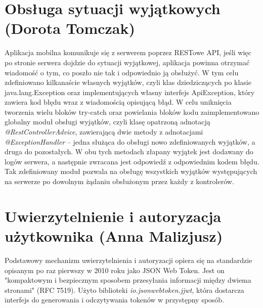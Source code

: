 \documentclass[10pt,twoside,a4paper]{report}
\begin{document}
\section{Obsługa sytuacji wyjątkowych (Dorota Tomczak)}
\par Aplikacja mobilna komunikuje się z serwerem poprzez RESTowe API, jeśli więc po stronie serwera dojdzie do sytuacji wyjątkowej, aplikacja powinna otrzymać wiadomość o tym, co poszło nie tak i odpowiednio ją obsłużyć. W tym celu zdefiniowano kilkanaście własnych wyjątków, czyli klas dziedziczących po klasie java.lang.Exception oraz implementujących własny interfejs ApiException, który zawiera kod błędu wraz z wiadomością opisującą błąd. W celu uniknięcia tworzenia wielu bloków try-catch oraz powielania bloków kodu zaimplementowano globalny moduł obsługi wyjątków, czyli klasę opatrzoną adnotacją \textit{@RestControllerAdvice}, zawierającą dwie metody z adnotacjami \textit{@ExceptionHandler} – jedna służąca do obsługi nowo zdefiniowanych wyjątków, a druga do pozostałych. W obu tych metodach złapany wyjątek jest dodawany do logów serwera, a następnie zwracana jest odpowiedź z odpowiednim kodem błędu. Tak zdefiniowany moduł pozwala na obsługę wszystkich wyjątków występujących na serwerze po dowolnym żądaniu obsłużonym przez każdy z kontrolerów.

\section{Uwierzytelnienie i autoryzacja użytkownika (Anna Malizjusz)}
\par Podstawowy mechanizm uwierzytelnienia i autoryzacji opiera się na standardzie opisanym po raz pierwszy w 2010 roku jako JSON Web Token. Jest on "kompaktowym i bezpiecznym sposobem przesyłania informacji między dwiema stronami" (RFC 7519\cite{JWT}). Użyto biblioteki \textit{io.jsonwebtoken.jjwt}\cite{JWT library}, która dostarcza interfejs do generowania i odczytywania tokenów w przystępny sposób.
\end{document}
